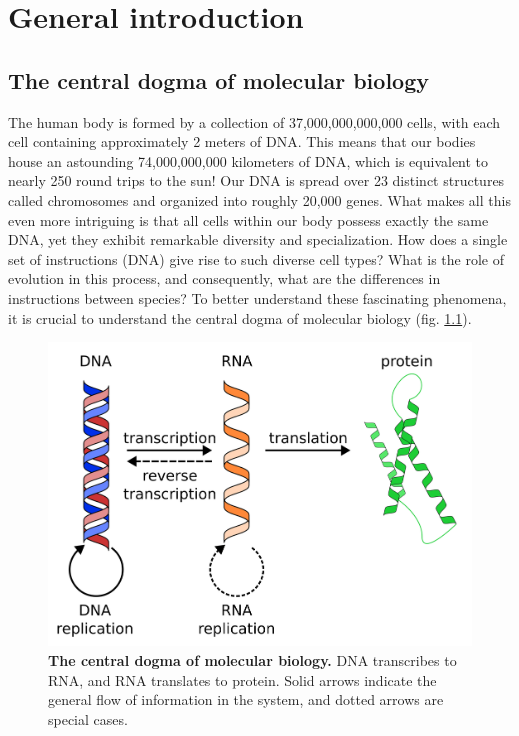 \chapter{General introduction}\thumbforchapter
\newpage

\section{The central dogma of molecular biology}

The human body is formed by a collection of 37,000,000,000,000 cells\cite{Bianconi2013}, with each cell containing approximately 2 meters of DNA. This means that our bodies house an astounding 74,000,000,000 kilometers of DNA, which is equivalent to nearly 250 round trips to the sun! Our DNA is spread over 23 distinct structures called chromosomes and organized into roughly 20,000 genes. What makes all this even more intriguing is that all cells within our body possess exactly the same DNA, yet they exhibit remarkable diversity and specialization. How does a single set of instructions (DNA) give rise to such diverse cell types? What is the role of evolution in this process, and consequently, what are the differences in instructions between species? To better understand these fascinating phenomena, it is crucial to understand the central dogma of molecular biology (fig. \ref{fig:central_dogma}).

\begin{figure}[H]
    \center
    \includegraphics[width=0.7\linewidth]{ch.introduction/imgs/central_dogma.png}
    \caption{\textbf{The central dogma of molecular biology.} DNA transcribes to RNA, and RNA translates to protein. Solid arrows indicate the general flow of information in the system, and dotted arrows are special cases.}
    \label{fig:central_dogma}
\end{figure}

